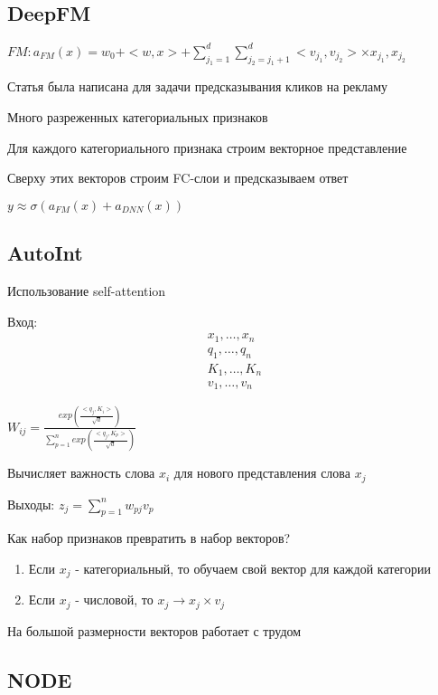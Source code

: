 \documentclass[a4paper, 12pt]{article}
\begin{document}
\subsection{DeepFM}

\(FM: a_{FM}(x) = w_0 + <w, x> + \sum_{j_1 = 1}^d\sum_{j_2 = j_1 + 1}^d 
<v_{j_1}, v_{j_2}> \times x_{j_1}, x_{j_2}\)

Статья была написана для задачи предсказывания кликов на рекламу

Много разреженных категориальных признаков

Для каждого категориального признака строим векторное представление

Сверху этих векторов строим FC-слои и предсказываем ответ


\(y \approx \sigma (a_{FM}(x) + a_{DNN}(x))\)

\subsection{AutoInt}

Использование self-attention

Вход: 
\begin{align*}
    x_1, \dots, x_n \\
    q_1, \dots, q_n \\
    K_1, \dots, K_n \\
    v_1, \dots, v_n
\end{align*}

\(W_{ij} = \frac{exp(\frac{<q_j, K_i>}{\sqrt{d}})}{\sum_{p = 1}^n exp(\frac{<q_j, K_p>}{\sqrt{d}})}\)

Вычисляет важность слова $x_i$ для нового представления слова $x_j$

Выходы: $z_j = \sum_{p = 1}^n w_{pj}v_p$

Как набор признаков превратить в набор векторов?

\begin{enumerate}
    \item Если $x_j$ - категориальный, то обучаем свой вектор для каждой категории
    \item Если $x_j$ - числовой, то $x_j \rightarrow x_j \times v_j$
\end{enumerate}

На большой размерности векторов работает с трудом

\subsection{NODE}
\end{document}

